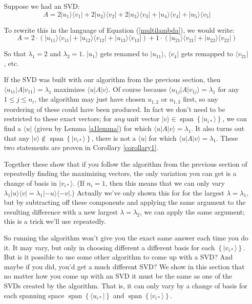 \documentclass{amsbook}
\begin{document}
\begin{tcolorbox}[title=Example,colback=blue!5]
Suppose we had an SVD:
$$
A=2|u_1\rangle\langle v_1|+2|u_2\rangle\langle v_2|+2|u_3\rangle\langle v_3|+|u_4\rangle\langle v_4|+|u_5\rangle\langle v_5|
$$

To rewrite this in the language of Equation (\ref{multilambda}), we would write:
$$
A=2\cdot\left(|u_{11}\rangle\langle v_{11}|+|u_{12}\rangle\langle v_{12}|+|u_{13}\rangle\langle v_{13}|\right)+1\cdot\left(|u_{21}\rangle\langle v_{21}|+|u_{22}\rangle\langle v_{22}|\right)
$$

So that $\lambda_1=2$ and $\lambda_2=1$.  $|u_1\rangle$ gets renamed to $|u_{11}\rangle$, $\langle v_4|$ gets remapped to $\langle v_{21}|$, etc.

\end{tcolorbox}

If the SVD was built with our algorithm from the previous section, then $\langle u_{11}|A|v_{11}\rangle=\lambda_1$ maximizes $\langle u|A|v\rangle$.  Of course because $\langle u_{1j}|A|v_{1j}\rangle=\lambda_1$ for any $1\leq j\leq n_i$, the algorithm may just have chosen $u_{1,2}$ or $u_{1,3}$ first, so any reordering of these could have been produced.  In fact we don't need to be restricted to these exact vectors; for {\em any} unit vector $|v\rangle\in\operatorname{span}\left\{|u_{i*}\rangle\right\}$, we can find a $\langle u|$ (given by Lemma \ref{a1lemma}) for which $\langle u|A|v\rangle=\lambda_1$.  It also turns out that any $|v\rangle\not\in\operatorname{span}\left\{|v_{i*}\rangle\right\}$, there is not a $\langle u|$ for which $\langle u|A|v\rangle=\lambda_1$.  These two statements are proven in Corollary \ref{corollary1}.

Together these show that if you follow the algorithm from the previous section of repeatedly finding the maximizing vectors, the only variation you can get is a change of basis in $|v_{i*}\rangle$.  (If $n_i=1$, then this means that we can only vary $\lambda_1|u\rangle\langle v|=\lambda_1|-u\rangle\langle -v|$.)  Actually we've only shown this for for the largest $\lambda=\lambda_1$, but by subtracting off these components and applying the same argument to the resulting difference with a new largest $\lambda=\lambda_2$, we can apply the same argument; this is a trick we'll use repeatedly.

So running the algorithm won't give you the exact same answer each time you do it.  It may vary, but only in choosing different a different basis for each $\left\{|v_{i*}\rangle\right\}$.  But is it possible to use some other algorithm to come up with a SVD?  And maybe if you did, you'd get a much different SVD?  We show in this section that no matter how you come up with an SVD it must be the same as one of the SVDs created by the algorithm.  That is, it can only vary by a change of basis for each spanning space $\operatorname{span}\left\{\langle u_{i*}|\right\}$ and $\operatorname{span}\left\{|v_{i*}\rangle\right\}$.
\end{document}
